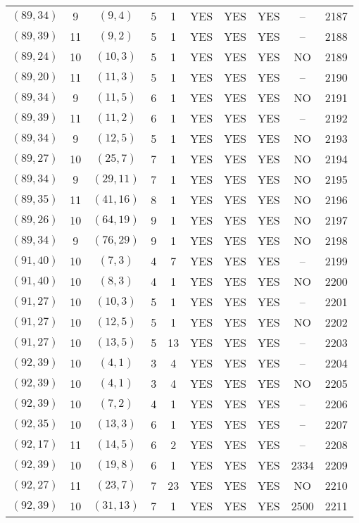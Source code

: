 \begin{longtable}{|c|c|c|c|c|c|c|c|c|c|}
$(89, 34)$ & 9 & $(9, 4)$ & 5 & 1 & YES & YES & YES & -- & 2187\\
$(89, 39)$ & 11 & $(9, 2)$ & 5 & 1 & YES & YES & YES & -- & 2188\\
$(89, 24)$ & 10 & $(10, 3)$ & 5 & 1 & YES & YES & YES & NO & 2189\\
$(89, 20)$ & 11 & $(11, 3)$ & 5 & 1 & YES & YES & YES & -- & 2190\\
$(89, 34)$ & 9 & $(11, 5)$ & 6 & 1 & YES & YES & YES & NO & 2191\\
$(89, 39)$ & 11 & $(11, 2)$ & 6 & 1 & YES & YES & YES & -- & 2192\\
$(89, 34)$ & 9 & $(12, 5)$ & 5 & 1 & YES & YES & YES & NO & 2193\\
$(89, 27)$ & 10 & $(25, 7)$ & 7 & 1 & YES & YES & YES & NO & 2194\\
$(89, 34)$ & 9 & $(29, 11)$ & 7 & 1 & YES & YES & YES & NO & 2195\\
$(89, 35)$ & 11 & $(41, 16)$ & 8 & 1 & YES & YES & YES & NO & 2196\\
$(89, 26)$ & 10 & $(64, 19)$ & 9 & 1 & YES & YES & YES & NO & 2197\\
$(89, 34)$ & 9 & $(76, 29)$ & 9 & 1 & YES & YES & YES & NO & 2198\\
$(91, 40)$ & 10 & $(7, 3)$ & 4 & 7 & YES & YES & YES & -- & 2199\\
$(91, 40)$ & 10 & $(8, 3)$ & 4 & 1 & YES & YES & YES & NO & 2200\\
$(91, 27)$ & 10 & $(10, 3)$ & 5 & 1 & YES & YES & YES & -- & 2201\\
$(91, 27)$ & 10 & $(12, 5)$ & 5 & 1 & YES & YES & YES & NO & 2202\\
$(91, 27)$ & 10 & $(13, 5)$ & 5 & 13 & YES & YES & YES & -- & 2203\\
$(92, 39)$ & 10 & $(4, 1)$ & 3 & 4 & YES & YES & YES & -- & 2204\\
$(92, 39)$ & 10 & $(4, 1)$ & 3 & 4 & YES & YES & YES & NO & 2205\\
$(92, 39)$ & 10 & $(7, 2)$ & 4 & 1 & YES & YES & YES & -- & 2206\\
$(92, 35)$ & 10 & $(13, 3)$ & 6 & 1 & YES & YES & YES & -- & 2207\\
$(92, 17)$ & 11 & $(14, 5)$ & 6 & 2 & YES & YES & YES & -- & 2208\\
$(92, 39)$ & 10 & $(19, 8)$ & 6 & 1 & YES & YES & YES & 2334 & 2209\\
$(92, 27)$ & 11 & $(23, 7)$ & 7 & 23 & YES & YES & YES & NO & 2210\\
$(92, 39)$ & 10 & $(31, 13)$ & 7 & 1 & YES & YES & YES & 2500 & 2211\\

\end{longtable}
